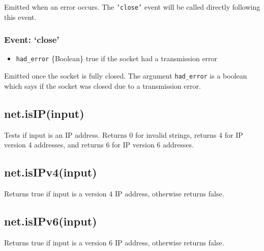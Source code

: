 Emitted when an error occurs. The \texttt{'close'} event will be called
directly following this event.

\subsubsection{Event: `close'}\label{event-close-1}

\begin{itemize}
\itemsep1pt\parskip0pt
\item
  \texttt{had\_error} \{Boolean\} true if the socket had a transmission
  error
\end{itemize}

Emitted once the socket is fully closed. The argument
\texttt{had\_error} is a boolean which says if the socket was closed due
to a transmission error.

\subsection{net.isIP(input)}\label{net.isipinput}

Tests if input is an IP address. Returns 0 for invalid strings, returns
4 for IP version 4 addresses, and returns 6 for IP version 6 addresses.

\subsection{net.isIPv4(input)}\label{net.isipv4input}

Returns true if input is a version 4 IP address, otherwise returns
false.

\subsection{net.isIPv6(input)}\label{net.isipv6input}

Returns true if input is a version 6 IP address, otherwise returns
false.

